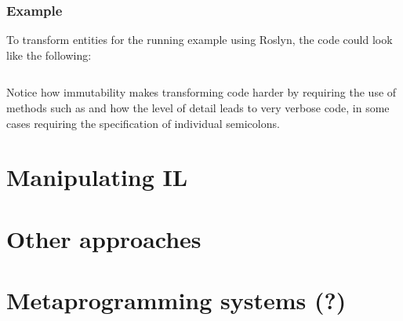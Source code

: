 
\subsubsection{Example}

To transform entities for the running example using Roslyn, the code could look like the following:

\inputminted[firstline=16,lastline=94]{csharp}{samples/Roslyn/Program.cs}

Notice how immutability makes transforming code harder by requiring the use of methods such as  and how the level of detail leads to very verbose code, in some cases requiring the specification of individual semicolons.

\section{Manipulating \acs{IL}}


\section{Other approaches}


\section{Metaprogramming systems (?)}
\label{metaprogramming}

